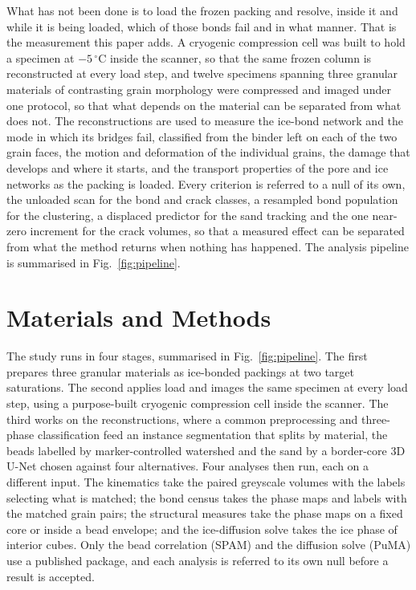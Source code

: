\documentclass[preprint,12pt,numbers]{elsarticle}
\begin{document}
  What has not been done is to load the frozen packing and resolve, inside it
  and while it is being loaded, which of those bonds fail and in what manner.  That is the
  measurement this paper adds.  A cryogenic compression cell was built to hold
  a specimen at $-5\,^\circ$C inside the scanner, so that the same frozen
  column is reconstructed at every load step, and twelve specimens spanning
  three granular materials of contrasting grain morphology were compressed and
  imaged under one protocol, so that what depends on the material can be
  separated from what does not.  The reconstructions are used to measure the
  ice-bond network and the mode in which its bridges fail, classified from the
  binder left on each of the two grain faces, the motion and deformation of the
  individual grains, the damage that develops and where it starts, and the
  transport properties of the pore and ice networks as the packing is loaded.
  Every criterion is referred to a null of its own, the unloaded scan for the
  bond and crack classes, a resampled bond population for the clustering, a
  displaced predictor for the sand tracking and the one near-zero increment
  for the crack volumes, so that a measured effect can be separated from what
  the method returns when nothing has happened.  The analysis pipeline is
  summarised in Fig.~\ref{fig:pipeline}.


  \section{Materials and Methods}
  \label{sec:materials_methods}
  The study runs in four stages, summarised in Fig.~\ref{fig:pipeline}.  The
  first prepares three granular materials as ice-bonded packings at two target
  saturations.  The second applies load and images the same specimen at every
  load step, using a purpose-built cryogenic compression cell inside the
  scanner.  The third works on the reconstructions, where a common
  preprocessing and three-phase classification feed an instance segmentation
  that splits by material, the beads labelled by marker-controlled watershed
  and the sand by a border-core 3D U-Net chosen against four alternatives.
  Four analyses then run, each on a different input.  The kinematics take the
  paired greyscale volumes with the labels selecting what is matched; the
  bond census takes the phase maps and labels with the matched grain pairs;
  the structural measures take the phase maps on a fixed core or inside a
  bead envelope; and the ice-diffusion solve takes the ice phase of interior
  cubes.  Only the bead correlation (SPAM) and the diffusion solve (PuMA) use
  a published package, and each analysis is referred to its own null
  before a result is accepted.
\end{document}
